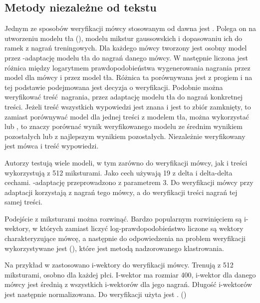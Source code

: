 \subsection{Metody niezależne od tekstu}

Jednym ze sposobów weryfikacji mówcy stosowanym od dawna jest . Polega on na utworzeniu modelu tła
(), modelu mikstur gaussowskich i dopasowaniu ich do ramek  z nagrań
treningowych. Dla każdego mówcy tworzony jest osobny model przez -adaptację modelu tła do nagrań danego
mówcy. W \cite{utteranceVerificationFor}
następnie liczona jest różnica między logarytmem prawdopodobieństwa wygenerowania nagrania przez model
dla mówcy i przez model tła. Różnica ta porównywana jest z progiem i na tej podstawie podejmowana jest decyzja
o weryfikacji. Podobnie można weryfikować treść nagrania, przez adaptację modelu tła do nagrań konkretnej treści.
Jeżeli treść wszystkich wypowiedzi jest znana i jest to zbiór zamknięty, to zamiast porównywać model dla jednej
treści z modelem tła, można wykorzystać  lub , to znaczy porównać wynik weryfikowanego
modelu ze średnim wynikiem pozostałych lub z najlepszym wynikiem pozostałych. Niezależnie weryfikowany jest mówca
i treść wypowiedzi.

Autorzy testują wiele modeli, w tym zarówno do weryfikacji mówcy, jak i treści wykorzystują  z 512 miksturami.
Jako cech używają 19  z delta i delta-delta cechami. -adaptację przeprowadzono
z parametrem  3.
Do weryfikacji mówcy przy adaptacji korzystają z nagrań tego mówcy, a do weryfikacji treści nagrań tej samej treści.

Podejście z miksturami można rozwinąć. Bardzo popularnym rozwinięciem są i-wektory, w których
zamiast liczyć log-prawdopodobieństwo liczone są wektory charakteryzujące mówcę, a następnie do
odpowiedzenia na problem weryfikacji wykorzystywane
jest  (), które jest metodą nadzorowanego klastrowania.

Na przykład w \cite{utteranceVerificationFor}
zastosowano i-wektory do weryfikacji mówcy. Trenują  z 512 miksturami, osobno dla każdej płci.
I-wektor ma rozmiar 400, i-wektor dla danego mówcy jest średnią z wszystkich i-wektorów dla jego nagrań.
Długość i-wektorów jest następnie normalizowana. Do weryfikacji użyta jest .
()

